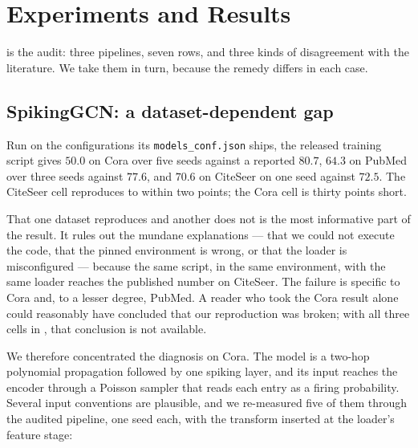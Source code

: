 \section{Experiments and Results}
\label{sec:results}



 is the audit: three pipelines, seven rows, and three kinds of disagreement with the
literature. We take them in turn, because the remedy differs in each case.

\subsection{SpikingGCN: a dataset-dependent gap}
\label{sec:sgcn}

Run on the configurations its \texttt{models\_conf.json} ships, the released training script gives
$50.0$ on Cora over five seeds against a reported $80.7$, $64.3$ on PubMed over three seeds against
$77.6$, and $70.6$ on CiteSeer on one seed against $72.5$. The CiteSeer cell reproduces to within two
points; the Cora cell is thirty points short.

That one dataset reproduces and another does not is the most informative part of the result. It rules
out the mundane explanations --- that we could not execute the code, that the pinned environment is
wrong, or that the loader is misconfigured --- because the same script, in the same environment, with
the same loader reaches the published number on CiteSeer. The failure is specific to Cora and, to a
lesser degree, PubMed. A reader who took the Cora result alone could reasonably have concluded that
our reproduction was broken; with all three cells in , that conclusion is not
available.

We therefore concentrated the diagnosis on Cora. The model is a two-hop polynomial propagation
followed by one spiking layer, and its input reaches the encoder through a Poisson sampler that
reads each entry as a firing probability. Several input conventions are plausible, and we
re-measured five of them through the audited pipeline, one seed each, with the transform inserted at
the loader's feature stage:


